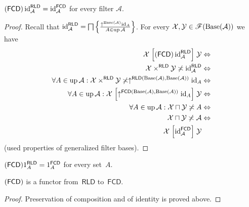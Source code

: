 \begin{prop}\label{fcd-id}
$(\mathsf{FCD})\operatorname{id}_{\mathcal{A}}^{\mathsf{RLD}}=\operatorname{id}_{\mathcal{A}}^{\mathsf{FCD}}$
for every filter $\mathcal{A}$.\end{prop}
\begin{proof}
Recall that $\operatorname{id}_{\mathcal{A}}^{\mathsf{RLD}}=\bigsqcap\left\{ \frac{\uparrow^{\operatorname{Base}(\mathcal{A})}\operatorname{id}_{A}}{A\in\operatorname{up}\mathcal{A}}\right\}$.
For every $\mathcal{X},\mathcal{Y}\in\mathscr{F}(\operatorname{Base}(\mathcal{A}))$ we
have
\begin{align*}
\mathcal{X}\mathrel{\left[(\mathsf{FCD})\operatorname{id}_{\mathcal{A}}^{\mathsf{RLD}}\right]}\mathcal{Y} & \Leftrightarrow\\
\mathcal{X}\times^{\mathsf{RLD}}\mathcal{Y}\not\asymp\operatorname{id}_{\mathcal{A}}^{\mathsf{RLD}} & \Leftrightarrow\\
\forall A\in\operatorname{up}\mathcal{A}:\mathcal{X}\times^{\mathsf{RLD}}\mathcal{Y}\not\asymp\uparrow^{\mathsf{RLD}(\operatorname{Base}(\mathcal{A}),\operatorname{Base}(\mathcal{A}))}\operatorname{id}_{A} & \Leftrightarrow\\
\forall A\in\operatorname{up}\mathcal{A}:\mathcal{X}\mathrel{\left[\uparrow^{\mathsf{FCD}(\operatorname{Base}(\mathcal{A}),\operatorname{Base}(\mathcal{A}))}\operatorname{id}_{A}\right]}\mathcal{Y} & \Leftrightarrow\\
\forall A\in\operatorname{up}\mathcal{A}:\mathcal{X}\sqcap\mathcal{Y}\not\asymp A & \Leftrightarrow\\
\mathcal{X}\sqcap\mathcal{Y}\not\asymp\mathcal{A} & \Leftrightarrow\\
\mathcal{X}\mathrel{\left[\operatorname{id}_{\mathcal{A}}^{\mathsf{FCD}}\right]}\mathcal{Y}
\end{align*}
(used properties of generalized filter bases).\end{proof}
\begin{cor}
$(\mathsf{FCD})1_{A}^{\mathsf{RLD}}=1_{A}^{\mathsf{FCD}}$ for every set~$A$.\end{cor}
\begin{prop}
$(\mathsf{FCD})$ is a functor from~$\mathsf{RLD}$ to~$\mathsf{FCD}$.\end{prop}
\begin{proof}
Preservation of composition and of identity is proved above.
\end{proof}

